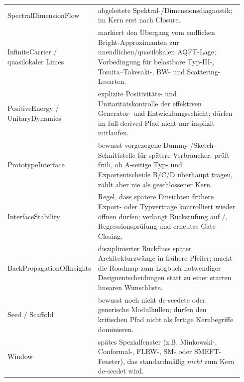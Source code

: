 \documentclass[11pt,a4paper]{article}
\newcommand{\code}[1]{\ifmmode\text{\ttfamily\seqsplit{#1}}\else\begingroup\ttfamily\seqsplit{#1}\endgroup\fi}
\begin{document}
\begin{longtable}{L{0.22\linewidth}L{0.72\linewidth}}
SpectralDimensionFlow & abgeleitete Spektral-/Dimensionsdiagnostik; im Kern erst nach Closure. \\
InfiniteCarrier / quasilokaler Limes & markiert den Übergang vom endlichen Bright-Approximanten zur unendlichen/quasilokalen AQFT-Lage; Vorbedingung für belastbare Typ-III-, Tomita--Takesaki-, BW- und Scattering-Lesarten. \\
PositiveEnergy / UnitaryDynamics & explizite Positivitäts- und Unitaritätskontrolle der effektiven Generator- und Entwicklungsschicht; dürfen im full-derived Pfad nicht nur implizit mitlaufen. \\
PrototypeInterface & bewusst vorgezogene Dummy-/Sketch-Schnittstelle für spätere Verbraucher; prüft früh, ob A-seitige Typ- und Exportentscheide B/C/D überhaupt tragen, zählt aber nie als geschlossener Kern. \\
InterfaceStability & Regel, dass spätere Einsichten frühere Export- oder Typverträge kontrolliert wieder öffnen dürfen; verlangt Rückstufung auf \code{Seed}/\code{Scaffold}, Regressionsprüfung und erneutes Gate-Closing. \\
BackPropagationOfInsights & disziplinierter Rückfluss später Architekturzwänge in frühere Pfeiler; macht die Roadmap zum Logbuch notwendiger Designentscheidungen statt zu einer starren linearen Wunschliste. \\
Seed / Scaffold & bewusst noch nicht de-seedete oder generische Modulhüllen; dürfen den kritischen Pfad nicht als fertige Kernbegriffe dominieren. \\
Window & spätes Spezialfenster (z.B. Minkowski-, Conformal-, FLRW-, SM- oder SMEFT-Fenster), das standardmäßig \emph{nicht} zum Kern de-seedet wird. \\
\end{longtable}
\end{document}
